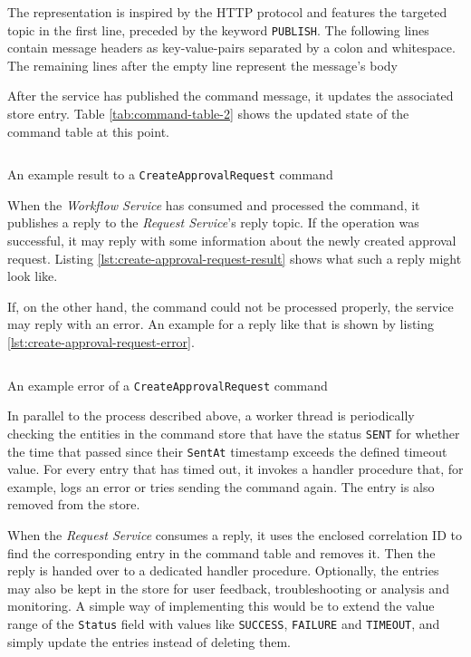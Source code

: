 The representation is inspired by the HTTP protocol and features the targeted topic in the first line, preceded by the keyword \texttt{PUBLISH}.
The following lines contain message headers as key-value-pairs separated by a colon and whitespace.
The remaining lines after the empty line represent the message's body

After the service has published the command message, it updates the associated store entry.
Table \ref{tab:command-table-2} shows the updated state of the command table at this point.

\begin{listing}[h]
  \inputminted{text}{assets/src/create-approval-request-result.txt}
  \caption{An example result to a \texttt{CreateApprovalRequest} command}\label{lst:create-approval-request-result}
\end{listing}

When the \emph{Workflow Service} has consumed and processed the command, it publishes a reply to the \emph{Request Service}'s reply topic.
If the operation was successful, it may reply with some information about the newly created approval request.
Listing \ref{lst:create-approval-request-result} shows what such a reply might look like.

If, on the other hand, the command could not be processed properly, the service may reply with an error.
An example for a reply like that is shown by listing \ref{lst:create-approval-request-error}.

\begin{listing}[h]
  \inputminted{text}{assets/src/error.txt}
  \caption{An example error of a \texttt{CreateApprovalRequest} command}\label{lst:create-approval-request-error}
\end{listing}

In parallel to the process described above, a worker thread is periodically checking the entities in the command store that have the status \texttt{SENT} for whether the time that passed since their \texttt{SentAt} timestamp exceeds the defined timeout value.
For every entry that has timed out, it invokes a handler procedure that, for example, logs an error or tries sending the command again.
The entry is also removed from the store.

When the \emph{Request Service} consumes a reply, it uses the enclosed correlation ID to find the corresponding entry in the command table and removes it.
Then the reply is handed over to a dedicated handler procedure.
Optionally, the entries may also be kept in the store for user feedback, troubleshooting or analysis and monitoring.
A simple way of implementing this would be to extend the value range of the \texttt{Status} field with values like \texttt{SUCCESS}, \texttt{FAILURE} and \texttt{TIMEOUT}, and simply update the entries instead of deleting them.

